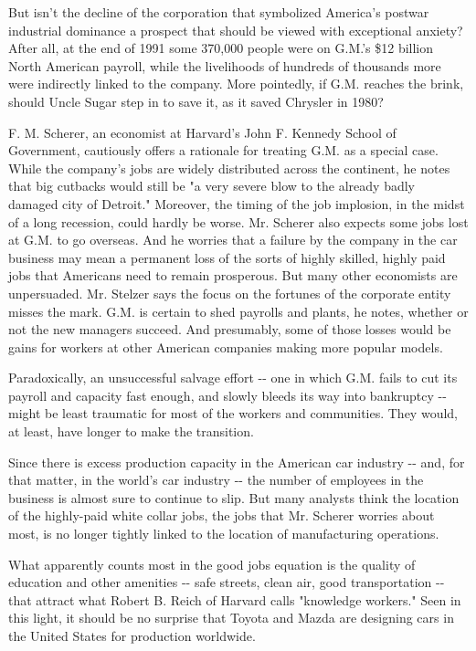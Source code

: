 But isn't the decline of the corporation that symbolized America's
postwar industrial dominance a prospect that should be viewed with
exceptional anxiety? After all, at the end of 1991 some 370,000 people
were on G.M.'s \$12 billion North American payroll, while the
livelihoods of hundreds of thousands more were indirectly linked to the
company. More pointedly, if G.M. reaches the brink, should Uncle Sugar
step in to save it, as it saved Chrysler in 1980?

F. M. Scherer, an economist at Harvard's John F. Kennedy School of
Government, cautiously offers a rationale for treating G.M. as a special
case. While the company's jobs are widely distributed across the
continent, he notes that big cutbacks would still be "a very severe blow
to the already badly damaged city of Detroit." Moreover, the timing of
the job implosion, in the midst of a long recession, could hardly be
worse. Mr. Scherer also expects some jobs lost at G.M. to go overseas.
And he worries that a failure by the company in the car business may
mean a permanent loss of the sorts of highly skilled, highly paid jobs
that Americans need to remain prosperous. But many other economists are
unpersuaded. Mr. Stelzer says the focus on the fortunes of the corporate
entity misses the mark. G.M. is certain to shed payrolls and plants, he
notes, whether or not the new managers succeed. And presumably, some of
those losses would be gains for workers at other American companies
making more popular models.

Paradoxically, an unsuccessful salvage effort -\/- one in which G.M.
fails to cut its payroll and capacity fast enough, and slowly bleeds its
way into bankruptcy -\/- might be least traumatic for most of the
workers and communities. They would, at least, have longer to make the
transition.

Since there is excess production capacity in the American car industry
-\/- and, for that matter, in the world's car industry -\/- the number
of employees in the business is almost sure to continue to slip. But
many analysts think the location of the highly-paid white collar jobs,
the jobs that Mr. Scherer worries about most, is no longer tightly
linked to the location of manufacturing operations.

What apparently counts most in the good jobs equation is the quality of
education and other amenities -\/- safe streets, clean air, good
transportation -\/- that attract what Robert B. Reich of Harvard calls
"knowledge workers." Seen in this light, it should be no surprise that
Toyota and Mazda are designing cars in the United States for production
worldwide.

